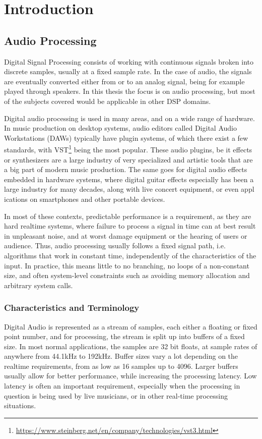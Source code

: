 \chapter{Introduction}
\label{chap:intro}

\section{Audio Processing}

Digital Signal Processing consists of working with continuous signals broken into discrete samples, usually
at a fixed sample rate. In the case of audio, the signals are eventually converted either from or to an
analog signal, being for example played through speakers. In this thesis the focus is on audio processing,
but most of the subjects covered would be applicable in other DSP domains.

Digital audio processing is used in many areas, and on a wide range of hardware. In music production on
desktop systems, audio editors called Digital Audio Workstations (DAWs) typically have plugin systems, of
which there exist a few standards, with VST\footnote{\url{https://www.steinberg.net/en/company/technologies/vst3.html}} being the most popular. These audio
plugins, be it effects or synthesizers are a large industry of very specialized and artistic tools that are a
big part of modern music production. The same goes for digital audio effects embedded in hardware systems,
where digital guitar effects especially has been a large industry for many decades, along with live concert
equipment, or even appl ications on smartphones and other portable devices.

In most of these contexts, predictable performance is a requirement, as they are hard realtime systems, where
failure to process a signal in time can at best result in unpleasant noise, and at worst damage equipment or
the hearing of users or audience. Thus, audio processing usually follows a fixed signal path, i.e. algorithms
that work in constant time, independently of the characteristics of the input. In practice, this means little
to no branching, no loops of a non-constant size, and often system-level constraints such as avoiding memory
allocation and arbitrary system calls.

\subsection{Characteristics and Terminology}

Digital Audio is represented as a stream of samples, each either a floating or fixed point number, and for
processing, the stream is split up into buffers of a fixed size. In most normal applications, the samples are
32 bit floats, at sample rates of anywhere from 44.1kHz to 192kHz. Buffer sizes vary a lot depending on the
realtime requirements, from as low as 16 samples up to 4096. Larger buffers usually allow for better
performance, while increasing the processing latency. Low latency is often an important requirement,
especially when the processing in question is being used by live musicians, or in other real-time processing
situations.

